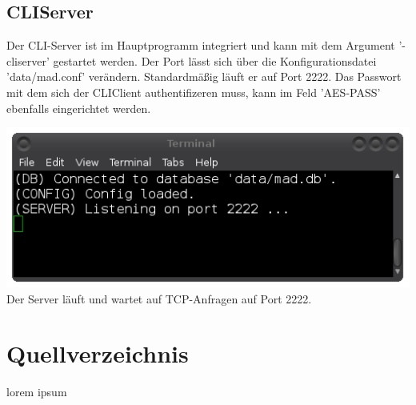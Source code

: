 \documentclass[12pt,a4paper]{report}
\begin{document}
\chapter{CLIServer}

Der CLI-Server ist im Hauptprogramm integriert und kann mit dem Argument '-cliserver' gestartet werden. Der Port lässt sich über die Konfigurationsdatei 'data/mad.conf' verändern. Standardmäßig läuft er auf Port 2222. Das Passwort mit dem sich der CLIClient authentifizeren muss, kann im Feld 'AES-PASS' ebenfalls eingerichtet werden.

\begin{center}
\includegraphics[scale=0.6]{img/cli_server.png}\\
Der Server läuft und wartet auf TCP-Anfragen auf Port 2222.
\end{center}

\part{Quellverzeichnis}
lorem ipsum
\end{document}
